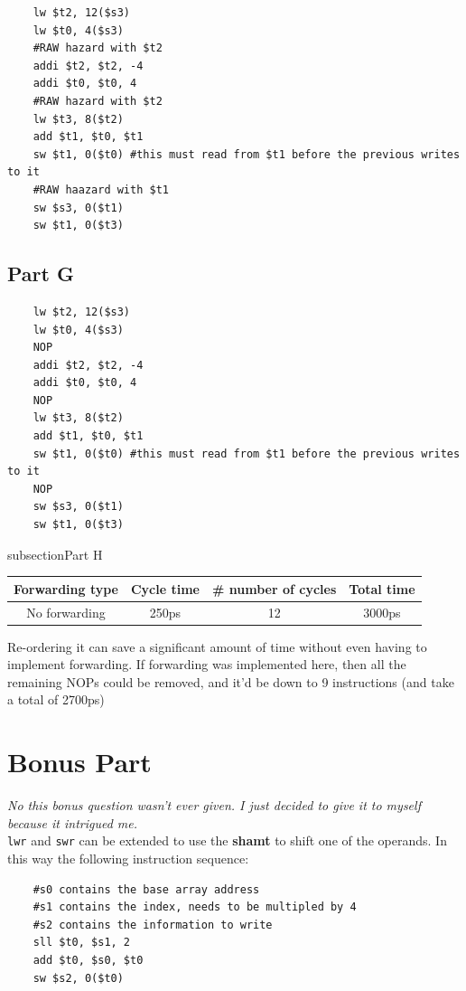 \documentclass[11pt]{article} %
\newcommand{\strong}[1]{\textbf{#1}}
\newcommand{\code}[1]{\texttt{#1}}
\begin{document}
\begin{verbatim}
    lw $t2, 12($s3)
    lw $t0, 4($s3)
    #RAW hazard with $t2
    addi $t2, $t2, -4
    addi $t0, $t0, 4
    #RAW hazard with $t2
    lw $t3, 8($t2)
    add $t1, $t0, $t1
    sw $t1, 0($t0) #this must read from $t1 before the previous writes to it
    #RAW haazard with $t1
    sw $s3, 0($t1)
    sw $t1, 0($t3)
\end{verbatim}

\subsection{Part G}

\begin{verbatim}
    lw $t2, 12($s3)
    lw $t0, 4($s3)
    NOP
    addi $t2, $t2, -4
    addi $t0, $t0, 4
    NOP
    lw $t3, 8($t2)
    add $t1, $t0, $t1
    sw $t1, 0($t0) #this must read from $t1 before the previous writes to it
    NOP
    sw $s3, 0($t1)
    sw $t1, 0($t3)
\end{verbatim}

subsection{Part H}

\begin{tabular}{c|c|c|c}
Forwarding type & Cycle time & \# number of cycles & Total time\\\hline
No forwarding & 250ps & 12 & 3000ps
\end{tabular}

Re-ordering it can save a significant amount of time without even having to implement forwarding. If forwarding was implemented here, then all the remaining NOPs could be removed, and it'd be down to 9 instructions (and take a total of 2700ps)

\section{Bonus Part}

\emph{No this bonus question wasn't ever given. I just decided to give it to myself because it intrigued me.}\\

\code{lwr} and \code{swr} can be extended to use the \strong{shamt} to shift one of the operands. In this way the following instruction sequence:

\begin{verbatim}
    #s0 contains the base array address
    #s1 contains the index, needs to be multipled by 4
    #s2 contains the information to write
    sll $t0, $s1, 2
    add $t0, $s0, $t0
    sw $s2, 0($t0)
\end{verbatim}
\end{document}
